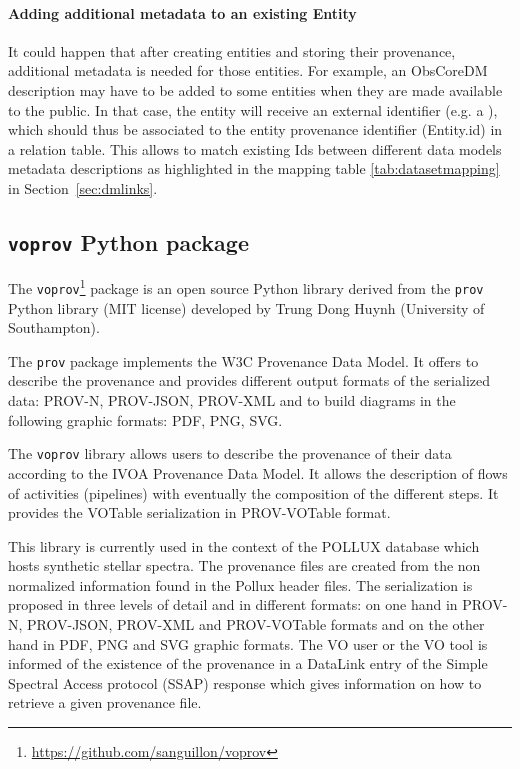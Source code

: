 \paragraph{Adding additional metadata to an existing Entity}
It could happen that after creating entities and storing their provenance, additional metadata is needed for those entities. For example, an ObsCoreDM description may have to be added to some entities when they are made available to the public. In that case, the entity will receive an external identifier (e.g. a ), which should thus be associated to the entity provenance identifier (Entity.id) in a relation table.
This allows to match existing Ids between different data models metadata descriptions as highlighted in the mapping table \ref{tab:datasetmapping} in Section~\ref{sec:dmlinks}.

\subsection{\texttt{voprov} Python package}\label{sec:implementation_voprov}
The \texttt{voprov}\footnote{\url{https://github.com/sanguillon/voprov}} package is an open source Python library derived from the \texttt{prov} Python
library (MIT license) developed by Trung Dong Huynh (University of
Southampton). 

The \texttt{prov} package implements the W3C Provenance Data Model.  It offers to
describe the provenance and provides different output formats of the serialized data: PROV-N, PROV-JSON, PROV-XML and to build diagrams in the following graphic formats: PDF, PNG, SVG.

The \texttt{voprov} library allows users to describe the provenance of their data
according to the IVOA Provenance Data Model. It allows the description of flows
of activities (pipelines) with eventually the composition of the different
steps. It provides the VOTable serialization in PROV-VOTable format.

This library is currently used in the context of the POLLUX database which hosts
synthetic stellar spectra. The provenance files are created from the non
normalized information found in the Pollux header files. The serialization is
proposed in three levels of detail and in different formats: on one hand in PROV-N,
PROV-JSON, PROV-XML and PROV-VOTable formats and on the other hand in PDF, PNG and SVG graphic
formats. The VO user or the VO tool is informed of the existence of the
provenance in a DataLink entry of the Simple Spectral Access protocol (SSAP) response which gives information on
how to retrieve a given provenance file.

